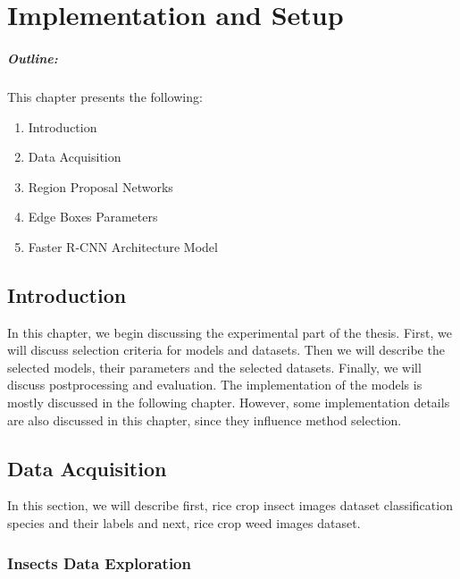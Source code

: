 \chapter{Implementation and Setup}\label{chap4}



\vspace*{40 ex}
\paragraph*{Outline:} This chapter presents the following:
\begin{enumerate}
\setlength{\itemsep}{-0.3em}
\item Introduction
\item Data Acquisition
\item Region Proposal Networks 
\item Edge Boxes Parameters
\item Faster R-CNN Architecture Model 
\end{enumerate}

\newpage

\section{Introduction}\label{chap4:intro}
In this chapter, we begin discussing the experimental part of the thesis. First, we will discuss selection criteria for models and datasets. Then we will describe the selected models, their parameters and the selected datasets. Finally, we will discuss postprocessing and evaluation. The implementation of the models is mostly discussed in the following chapter. However, some implementation details are also discussed in this chapter, since they influence method selection.


\section{Data Acquisition}
In this section, we will describe first, rice crop insect images dataset classification species and their labels  and next, rice crop weed images dataset.  

\subsection{Insects Data Exploration }


